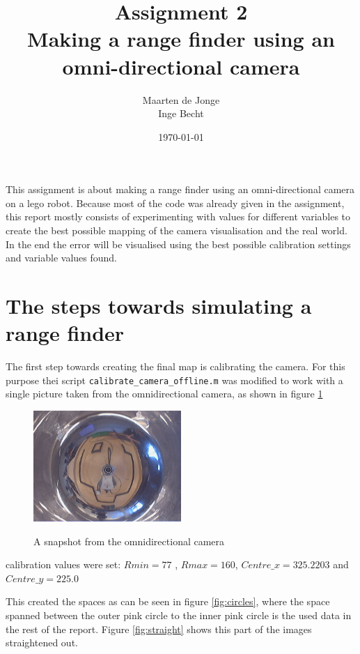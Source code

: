 \documentclass[a4paper, 20pt]{article}
\author{Maarten de Jonge \\
    Inge Becht}
\date{\today}
\title{Assignment 2\\ 
Making a range finder using an omni-directional camera }
\begin{document}
\maketitle

This assignment is about making a range finder using an omni-directional
camera on a lego robot. 
Because most of the code was already given in the assignment, this report
mostly consists of experimenting with values for different variables to
create the best possible mapping of the camera visualisation and the real world.
In the end the error will be visualised using the best possible calibration
settings and variable values found.

\section{The steps towards simulating a range finder}

The first step towards creating the final map is calibrating the camera. For
this purpose thei script \texttt{calibrate\_camera\_offline.m} was modified to
work with a single picture taken from the omnidirectional camera, as shown in
figure \ref{fig:snapshot}


\begin{figure}[!ht]
\centering
  \includegraphics[width=0.5\textwidth]{omni_snapshot.jpg}
  \label{fig:snapshot}
  \caption{A snapshot from the omnidirectional camera}
\end{figure}

calibration values were set: $Rmin = 77$ , $Rmax = 160$, $Centre\_x = 325.2203$ and
$Centre\_y =  225.0$

This created the spaces as can be seen in figure \ref{fig:circles}, where the space spanned between the
outer pink circle to
the inner pink circle is the used data in the rest of the report. Figure
\ref{fig:straight} shows this part of the images straightened out.
\end{document}
